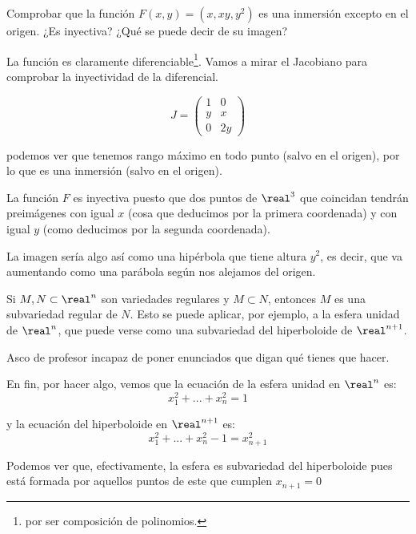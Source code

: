 \begin{problem}[2]

Comprobar que la función $F(x,y)=(x,xy,y^2)$ es una inmersión excepto en el origen. ¿Es inyectiva? ¿Qué se puede decir de su imagen?

\solution


La función es claramente diferenciable\footnote{por ser composición de polinomios.}. Vamos a mirar el Jacobiano para comprobar la inyectividad de la diferencial.

\[ J = \left( \begin{array}{cc}
1 & 0\\
y & x \\
0 & 2y \end{array} \right)\]

podemos ver que tenemos rango máximo en todo punto (salvo en el origen), por lo que es una inmersión (salvo en el origen).

La función $F$ es inyectiva puesto que dos puntos de $\real^3$ que coincidan tendrán preimágenes con igual $x$ (cosa que deducimos por la primera coordenada) y con igual $y$ (como deducimos por la segunda coordenada).

La imagen sería algo así como una hipérbola que tiene altura $y^2$, es decir, que va aumentando como una parábola según nos alejamos del origen.

\end{problem}

\begin{problem}[3]
Si $M, N \subset \real^n$ son variedades regulares  y $M \subset N$, entonces $M$ es una subvariedad regular de $N$. Esto se puede aplicar, por ejemplo, a la esfera unidad de $\real^n$, que puede verse como una subvariedad del hiperboloide de $\real^{n+1}$.

\solution


Asco de profesor incapaz de poner enunciados que digan qué tienes que hacer.

En fin, por hacer algo, vemos que la ecuación de la esfera unidad en $\real^n$ es:
\[x_1^2 + ... + x_n^2 = 1\]

y la ecuación del hiperboloide en $\real^{n+1}$ es:
\[x_1^2+...+x_n^2-1=x_{n+1}^2\]

Podemos ver que, efectivamente, la esfera es subvariedad del hiperboloide pues está formada por aquellos puntos de este que cumplen $x_{n+1}=0$
\end{problem}

